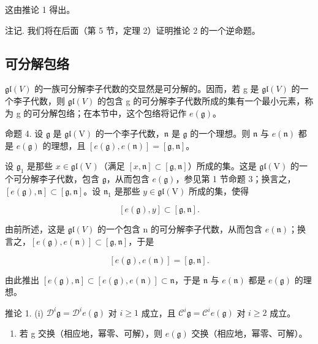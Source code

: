 这由推论 1 得出。

注记. 我们将在后面（第 5 节，定理 2）证明推论 2 的一个逆命题。

\subsection{可分解包络}

\(\mathfrak{gl}(V)\) 的一族可分解李子代数的交显然是可分解的。因而，若 g 是 \(\mathfrak{gl}(V)\) 的一个李子代数，则 \(\mathfrak{gl}(V)\) 的包含 g 的可分解李子代数所成的集有一个最小元素，称为 g 的可分解包络；在本节中，这个包络将记作 \(e(\mathfrak{g})\)。

命题 4. 设 \(\mathfrak{g}\) 是 \(\mathfrak{gl}(\mathrm{V})\) 的一个李子代数，\(\mathfrak{n}\) 是 \(\mathfrak{g}\) 的一个理想。则 \(\mathfrak{n}\) 与 \(e(\mathfrak{n})\) 都是 \(e(\mathfrak{g})\) 的理想，且 \([e(\mathfrak{g}), e(\mathfrak{n})] = [\mathfrak{g}, \mathfrak{n}]\)。

设 \(\mathfrak{g}_1\) 是那些 \(x\in \mathfrak{gl}(\mathrm{V})\)（满足 \([x,\mathfrak{n}]\subset [\mathfrak{g},\mathfrak{n}]\)）所成的集。这是 \(\mathfrak{gl}(\mathrm{V})\) 的一个可分解李子代数，包含 \(\mathfrak{g}\)，从而包含 \(e(\mathfrak{g})\)，参见第 1 节命题 3；换言之，\([e(\mathfrak{g}),\mathfrak{n}]\subset [\mathfrak{g},\mathfrak{n}]\)。设 \(\mathfrak{n}_1\) 是那些 \(y\in \mathfrak{gl}(\mathrm{V})\) 所成的集，使得

\[
[ e (\mathfrak {g}), y ] \subset [ \mathfrak {g}, \mathfrak {n} ].
\]

由前所述，这是 \(\mathfrak{gl}(V)\) 的一个包含 n 的可分解李子代数，从而包含 \(e(\mathfrak{n})\)；换言之，\([e(\mathfrak{g}), e(\mathfrak{n})] \subset [\mathfrak{g}, \mathfrak{n}]\)，于是

\[
[ e (\mathfrak {g}), e (\mathfrak {n}) ] = [ \mathfrak {g}, \mathfrak {n} ].
\]

由此推出 \([e(\mathfrak{g}),\mathfrak{n}]\subset [e(\mathfrak{g}),e(\mathfrak{n})]\subset \mathfrak{n}\)，于是 \(\mathfrak{n}\) 与 \(e(\mathfrak{n})\) 都是 \(e(\mathfrak{g})\) 的理想。

推论 1. (i) \(\mathcal{D}^i\mathfrak{g} = \mathcal{D}^i e(\mathfrak{g})\) 对 \(i\geq 1\) 成立，且 \(\mathcal{C}^i\mathfrak{g} = \mathcal{C}^i e(\mathfrak{g})\) 对 \(i\geq 2\) 成立。

\begin{enumerate}
\def\labelenumi{(\roman{enumi})}
\setcounter{enumi}{1}
\tightlist
\item
  若 g 交换（相应地，幂零、可解），则 \(e(\mathfrak{g})\) 交换（相应地，幂零、可解）。
\end{enumerate}

